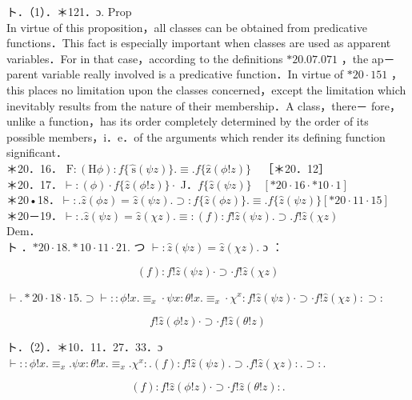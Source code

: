 \documentclass[10pt]{article}
\begin{document}
ト．（1）．＊121．ɔ. Prop\\
In virtue of this proposition，all classes can be obtained from predicative functions．This fact is especially important when classes are used as apparent variables．For in that case，according to the definitions $* 20.07 .071$ ，the ap－ parent variable really involved is a predicative function．In virtue of $* 20 \cdot 151$ ， this places no limitation upon the classes concerned，except the limitation which inevitably results from the nature of their membership．A class，there－ fore，unlike a function，has its order completely determined by the order of its possible members，i．e．of the arguments which render its defining function significant．\\
＊20．16． $\mathrm{F}:(\mathrm{H} \phi): f\{\widehat{\mathrm{~s}}(\psi z)\} . \equiv . f\{\widehat{\mathrm{z}}(\phi!z)\} \quad$［＊20．12］\\
＊20．17．$\vdash:(\phi) \cdot f\{\hat{z}(\phi!z)\} \cdot$ J．$f\{\hat{z}(\psi z)\} \quad[* 20 \cdot 16 \cdot * 10 \cdot 1]$\\
＊20•18．$\vdash: . \hat{z}(\phi z)=\hat{z}(\psi z) . \supset: f\{\hat{z}(\phi z)\} . \equiv . f\{\hat{z}(\psi z)\}[* 20 \cdot 11 \cdot 15]$\\
＊20－19．$\vdash: . \hat{z}(\psi z)=\hat{z}(\chi z) . \equiv:(f): f!\hat{z}(\psi z) . \supset . f!\hat{z}(\chi z)$\\
Dem．\\
ト ．$* 20 \cdot 18 . * 10 \cdot 11 \cdot 21$. つ $\vdash: \hat{z}(\psi z)=\hat{z}(\chi z)$. ɔ ：


\begin{equation*}
(f): f!\hat{z}(\psi z) \cdot \supset \cdot f!\hat{z}(\chi z) \tag{1}
\end{equation*}


$\vdash . * 20 \cdot 18 \cdot 15 . \supset \vdash:: \phi!x . \equiv_{x} \cdot \psi x: \theta!x . \equiv_{x} \cdot \chi^{x}: f!\hat{z}(\psi z) \cdot \supset \cdot f!\hat{z}(\chi z): \supset:$


\begin{equation*}
f!\hat{z}(\phi!z) \cdot \supset \cdot f!\hat{z}(\theta!z) \tag{2}
\end{equation*}


ト．（2）．＊10．11．27．33．ɔ\\
$\vdash:: \phi!x . \equiv_{x} . \psi x: \theta!x . \equiv_{x} . \chi^{x}: .(f): f!\hat{z}(\psi z) . \supset . f!\hat{z}(\chi z): . \supset:$.

$$
(f): f!\hat{z}(\phi!z) \cdot \supset \cdot f!\hat{z}(\theta!z): .
$$
\end{document}
